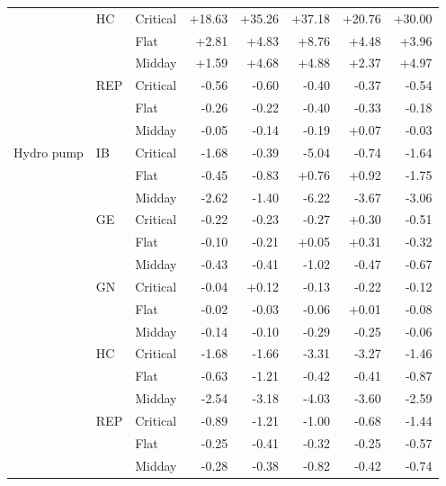 \begin{tabular}{l l l r r r r r }
 & HC & Critical & +18.63 & +35.26 & +37.18 & +20.76 & +30.00 \\
 &  & Flat & +2.81 & +4.83 & +8.76 & +4.48 & +3.96 \\
 &  & Midday & +1.59 & +4.68 & +4.88 & +2.37 & +4.97 \\
 & REP & Critical & -0.56 & -0.60 & -0.40 & -0.37 & -0.54 \\
 &  & Flat & -0.26 & -0.22 & -0.40 & -0.33 & -0.18 \\
 &  & Midday & -0.05 & -0.14 & -0.19 & +0.07 & -0.03 \\
\addlinespace
Hydro pump & IB & Critical & -1.68 & -0.39 & -5.04 & -0.74 & -1.64 \\
 &  & Flat & -0.45 & -0.83 & +0.76 & +0.92 & -1.75 \\
 &  & Midday & -2.62 & -1.40 & -6.22 & -3.67 & -3.06 \\
 & GE & Critical & -0.22 & -0.23 & -0.27 & +0.30 & -0.51 \\
 &  & Flat & -0.10 & -0.21 & +0.05 & +0.31 & -0.32 \\
 &  & Midday & -0.43 & -0.41 & -1.02 & -0.47 & -0.67 \\
 & GN & Critical & -0.04 & +0.12 & -0.13 & -0.22 & -0.12 \\
 &  & Flat & -0.02 & -0.03 & -0.06 & +0.01 & -0.08 \\
 &  & Midday & -0.14 & -0.10 & -0.29 & -0.25 & -0.06 \\
 & HC & Critical & -1.68 & -1.66 & -3.31 & -3.27 & -1.46 \\
 &  & Flat & -0.63 & -1.21 & -0.42 & -0.41 & -0.87 \\
 &  & Midday & -2.54 & -3.18 & -4.03 & -3.60 & -2.59 \\
 & REP & Critical & -0.89 & -1.21 & -1.00 & -0.68 & -1.44 \\
 &  & Flat & -0.25 & -0.41 & -0.32 & -0.25 & -0.57 \\
 &  & Midday & -0.28 & -0.38 & -0.82 & -0.42 & -0.74 \\
\bottomrule
\end{tabular}